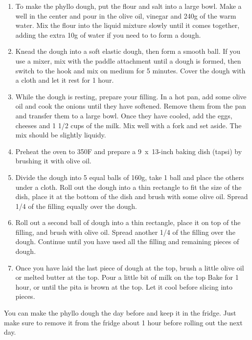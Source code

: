 \begin{enumerate}
    \item To make the phyllo dough, put the flour and salt into a large bowl. Make a well in the center and pour in the olive oil, vinegar and 240g of the warm water. Mix the flour into the liquid mixture slowly until it comes together, adding the extra 10g of water if you need to to form a dough.
    \item Knead the dough into a soft elastic dough, then form a smooth ball. If you use a mixer, mix with the paddle attachment until a dough is formed, then switch to the hook and mix on medium for 5 minutes. Cover the dough with a cloth and let it rest for 1 hour.
    \item While the dough is resting, prepare your filling. In a hot pan, add some olive oil and cook the onions until they have softened. Remove them from the pan and transfer them to a large bowl. Once they have cooled, add the eggs, cheeses and 1 1/2 cups of the milk. Mix well with a fork and set aside. The mix should be slightly liquidy.
    \item Preheat the oven to 350\degree F and prepare a 9~x~13-inch baking dish (tapsi) by brushing it with olive oil.
    \item Divide the dough into 5 equal balls of 160g, take 1 ball and place the others under a cloth. Roll out the dough into a thin rectangle to fit the size of the dish, place it at the bottom of the dish and brush with some olive oil. Spread 1/4 of the filling equally over the dough.
    \item Roll out a second ball of dough into a thin rectangle, place it on top of the filling, and brush with olive oil. Spread another 1/4 of the filling over the dough. Continue until you have used all the filling and remaining pieces of dough.
    \item Once you have laid the last piece of dough at the top, brush a little olive oil or melted butter at the top. Pour a little bit of milk on the top
    Bake for 1 hour, or until the pita is brown at the top. Let it cool before slicing into pieces.
\end{enumerate}

You can make the phyllo dough the day before and keep it in the fridge. Just make sure to remove it from the fridge about 1 hour before rolling out the next day.


